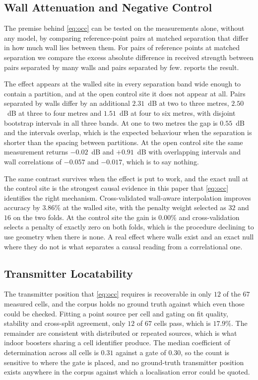 \subsection{Wall Attenuation and Negative Control}

The premise behind \cref{eq:occ} can be tested on the measurements alone, without any
model, by comparing reference-point pairs at matched separation that differ in how
much wall lies between them. For pairs of reference points at matched separation we compare the excess
absolute difference in received strength between pairs separated by many walls and
pairs separated by few.  reports the result.

The effect appears at the walled site in every separation band wide enough to contain
a partition, and at the open control site it does not appear at all. Pairs separated by walls
differ by an additional $2.31$~dB at two to three metres, $2.50$~dB at three to
four metres and $1.51$~dB at four to six metres, with disjoint bootstrap intervals
in all three bands. At one to two metres the gap is $0.55$~dB and the intervals
overlap, which is the expected behaviour when the separation is shorter than the
spacing between partitions. At the open control site the same measurement returns
$-0.02$~dB and $+0.91$~dB with overlapping intervals and wall correlations of
$-0.057$ and $-0.017$, which is to say nothing.

The same contrast survives when the effect is put to work, and the exact null at the
control site is the strongest causal evidence in this paper that \cref{eq:occ}
identifies the right mechanism. Cross-validated
wall-aware interpolation improves accuracy by $3.86\%$ at the walled site, with the
penalty weight selected as $32$ and $16$ on the two folds. At the control site the
gain is $0.00\%$ and cross-validation selects a penalty of exactly zero on both
folds, which is the procedure declining to use geometry when there is none. A real effect where
walls exist and an exact null where they do not is what separates a causal reading
from a correlational one.

\subsection{Transmitter Locatability}
\label{sec:locatable}

The transmitter position that \cref{eq:occ} requires is recoverable in only $12$ of
the $67$ measured cells, and the corpus holds no ground truth against which even
those could be checked. Fitting a point source per cell and gating on fit quality, stability
and cross-split agreement, only $12$ of $67$ cells pass, which is $17.9\%$. The
remainder are consistent with distributed or repeated sources, which is what indoor
boosters sharing a cell identifier produce. The median coefficient of determination
across all cells is $0.31$ against a gate of $0.30$, so the count is sensitive to
where the gate is placed, and no ground-truth transmitter position exists anywhere
in the corpus against which a localisation error could be quoted.

